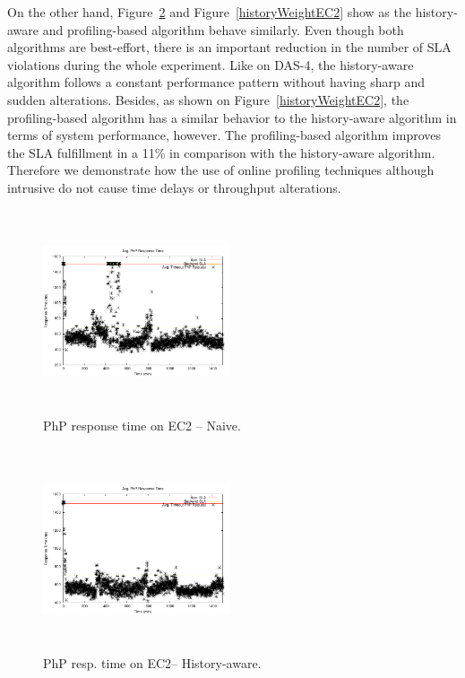 On the other hand, Figure~\ref{historyEC2} and Figure~\ref{historyWeightEC2} show as the history-aware and profiling-based algorithm behave similarly. Even though both algorithms are best-effort, there is an important reduction in the number of SLA violations during the whole experiment. Like on DAS-4, the history-aware algorithm follows a constant performance pattern without having sharp and sudden alterations. Besides, as shown on Figure~\ref{historyWeightEC2}, the profiling-based algorithm has a similar behavior to the history-aware algorithm in terms of system performance, however. The profiling-based algorithm improves the SLA fulfillment in a 11\% in comparison with the history-aware algorithm. Therefore we demonstrate how the use of online profiling techniques although intrusive do not cause time delays or throughput alterations. 



\begin{figure}
\begin{center}
\includegraphics[width=0.49\textwidth, height=6cm]{./images/heterogeneous/avgTimeout_PhP_naive}
\end{center}
\caption{PhP  response time on EC2 -- Naive.}
\label{naiveEC2}
\end{figure}


\begin{figure}
\begin{center}
\includegraphics[width=0.49\textwidth, height=6cm]{./images/heterogeneous/avgTimeout_PhP_history}
\end{center}
\caption{PhP resp. time on EC2-- History-aware.}
\label{historyEC2}
\end{figure}

